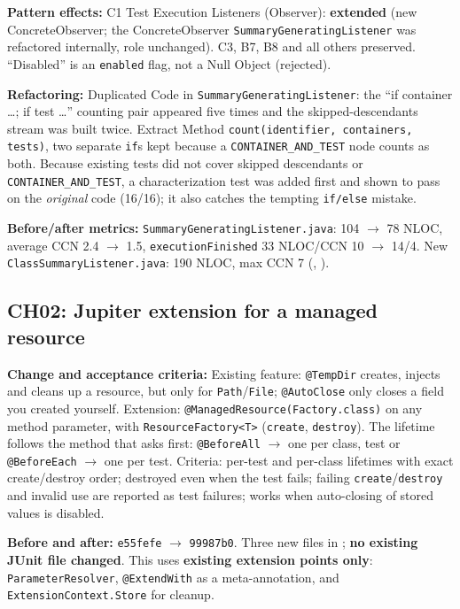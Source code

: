\documentclass[11pt,a4paper]{article}
\newcommand{\entry}[1]{\textbf{#1:} }
\begin{document}
\entry{Pattern effects}C1 Test Execution Listeners (Observer): \textbf{extended} (new ConcreteObserver; the ConcreteObserver \texttt{SummaryGeneratingListener} was refactored internally, role unchanged). C3, B7, B8 and all others preserved. ``Disabled'' is an \texttt{enabled} flag, not a Null Object (rejected).

\entry{Refactoring}Duplicated Code in \texttt{SummaryGeneratingListener}: the ``if container \dots; if test \dots'' counting pair appeared five times and the skipped-descendants stream was built twice. Extract Method \texttt{count(identifier, containers, tests)}, two separate \texttt{if}s kept because a \texttt{CONTAINER\_AND\_TEST} node counts as both. Because existing tests did not cover skipped descendants or \texttt{CONTAINER\_AND\_TEST}, a characterization test was added first and shown to pass on the \emph{original} code (16/16); it also catches the tempting \texttt{if/else} mistake.

\entry{Before/after metrics}\texttt{SummaryGeneratingListener.java}: 104 $\rightarrow$ 78 NLOC, average CCN 2.4 $\rightarrow$ 1.5, \texttt{executionFinished} 33 NLOC/CCN 10 $\rightarrow$ 14/4. New \texttt{ClassSummaryListener.java}: 190 NLOC, max CCN 7 (, ).

\subsection*{CH02: Jupiter extension for a managed resource}
\entry{Change and acceptance criteria}Existing feature: \texttt{@TempDir} creates, injects and cleans up a resource, but only for \texttt{Path}/\texttt{File}; \texttt{@AutoClose} only closes a field you created yourself. Extension: \texttt{@ManagedResource(Factory.class)} on any method parameter, with \texttt{ResourceFactory<T>} (\texttt{create}, \texttt{destroy}). The lifetime follows the method that asks first: \texttt{@BeforeAll} $\rightarrow$ one per class, test or \texttt{@BeforeEach} $\rightarrow$ one per test. Criteria: per-test and per-class lifetimes with exact create/destroy order; destroyed even when the test fails; failing \texttt{create}/\texttt{destroy} and invalid use are reported as test failures; works when auto-closing of stored values is disabled.

\entry{Before and after}\texttt{e55fefe} $\rightarrow$ \texttt{99987b0}. Three new files in ; \textbf{no existing JUnit file changed}. This uses \textbf{existing extension points only}: \texttt{ParameterResolver}, \texttt{@ExtendWith} as a meta-annotation, and \texttt{ExtensionContext.Store} for cleanup.
\end{document}
